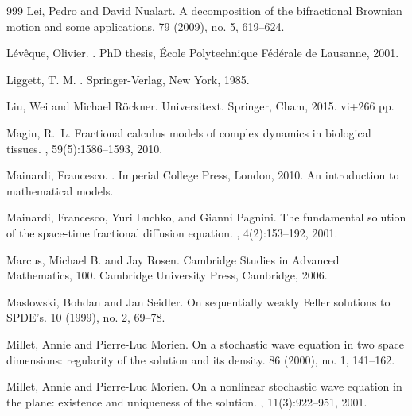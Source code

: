 \documentclass[a4paper,12pt]{article}
\theoremstyle{plain}
\theoremstyle{definition}
\begin{document}
\begin{thebibliography}{999}
Lei, Pedro and David Nualart.
\newblock A decomposition of the bifractional Brownian motion and some applications. 
 79 (2009), no. 5, 619--624.


L{\'e}v{\^e}que, Olivier.
.
\newblock PhD thesis, \'Ecole Polytechnique F\'ed\'erale de Lausanne, 2001.

Liggett, T. M.
.
\newblock Springer-Verlag, New York, 1985.

Liu, Wei and Michael R\"ockner.
\newblock Universitext. Springer, Cham, 2015. vi+266 pp.


Magin, R.~L.
\newblock Fractional calculus models of complex dynamics in biological tissues.
, 59(5):1586--1593, 2010.

Mainardi, Francesco.
.
\newblock Imperial College Press, London, 2010.
\newblock An introduction to mathematical models.

Mainardi, Francesco, Yuri Luchko, and Gianni Pagnini.
\newblock The fundamental solution of the space-time fractional diffusion equation.
, 4(2):153--192, 2001.

Marcus, Michael B. and Jay Rosen.
\newblock Cambridge Studies in Advanced Mathematics, 100. Cambridge University Press, Cambridge, 2006.

Maslowski, Bohdan and Jan Seidler.
\newblock On sequentially weakly Feller solutions to SPDE's. 
 10 (1999), no. 2, 69--78. 


Millet, Annie and Pierre-Luc Morien.
\newblock On a stochastic wave equation in two space dimensions: regularity of the solution and its density. 
 86 (2000), no. 1, 141--162.

Millet, Annie and Pierre-Luc Morien.
\newblock On a nonlinear stochastic wave equation in the plane: existence and uniqueness of the solution.
, 11(3):922--951, 2001.


\end{thebibliography}
\end{document}
